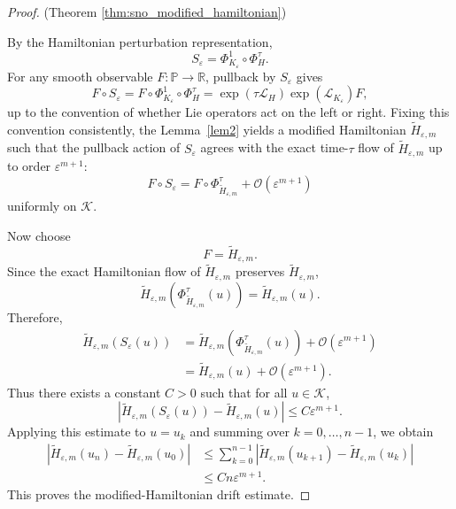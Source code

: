 \documentclass{article}
\theoremstyle{plain}
\theoremstyle{definition}
\theoremstyle{remark}
\newcommand{\bbR}{\mathbb{R}}
\newcommand{\bbP}{\mathbb{P}}
\newcommand{\abs}[1]{\left\lvert #1\right\rvert}
\begin{document}
\begin{proof}(Theorem \ref{thm:sno_modified_hamiltonian})

By the Hamiltonian perturbation representation,
\[
    S_\varepsilon=\Phi_{K_\varepsilon}^1\circ\Phi_H^\tau.
\]
For any smooth observable \(F:\bbP\to\bbR\), pullback by \(S_\varepsilon\) gives
\[
    F\circ S_\varepsilon
    =F\circ\Phi_{K_\varepsilon}^1\circ\Phi_H^\tau
    =\exp(\tau\mathcal{L}_H)\exp(\mathcal{L}_{K_\varepsilon})F,
\]
up to the convention of whether Lie operators act on the left or right. Fixing this convention consistently, the Lemma~\ref{lem2} yields a modified Hamiltonian \(\widetilde H_{\varepsilon,m}\) such that the pullback action of \(S_\varepsilon\) agrees with the exact time-\(\tau\) flow of \(\widetilde H_{\varepsilon,m}\) up to order \(\varepsilon^{m+1}\):
\[
    F\circ S_\varepsilon
    =F\circ\Phi_{\widetilde H_{\varepsilon,m}}^\tau
     +\mathcal{O}(\varepsilon^{m+1})
\]
uniformly on \(\mathcal{K}\).

Now choose
\[
    F=\widetilde H_{\varepsilon,m}.
\]
Since the exact Hamiltonian flow of \(\widetilde H_{\varepsilon,m}\) preserves \(\widetilde H_{\varepsilon,m}\),
\[
    \widetilde H_{\varepsilon,m}(\Phi_{\widetilde H_{\varepsilon,m}}^\tau(u))
    =\widetilde H_{\varepsilon,m}(u).
\]
Therefore,
\[
\begin{aligned}
    \widetilde H_{\varepsilon,m}(S_\varepsilon(u))
    &=\widetilde H_{\varepsilon,m}(\Phi_{\widetilde H_{\varepsilon,m}}^\tau(u))
      +\mathcal{O}(\varepsilon^{m+1}) \\
    &=\widetilde H_{\varepsilon,m}(u)+\mathcal{O}(\varepsilon^{m+1}).
\end{aligned}
\]
Thus there exists a constant \(C>0\) such that for all \(u\in\mathcal{K}\),
\[
    \abs{\widetilde H_{\varepsilon,m}(S_\varepsilon(u))-\widetilde H_{\varepsilon,m}(u)}
    \leq C\varepsilon^{m+1}.
\]
Applying this estimate to \(u=u_k\) and summing over \(k=0,\ldots,n-1\), we obtain
\[
\begin{aligned}
    \abs{\widetilde H_{\varepsilon,m}(u_n)-\widetilde H_{\varepsilon,m}(u_0)}
    &\leq
    \sum_{k=0}^{n-1}
    \abs{\widetilde H_{\varepsilon,m}(u_{k+1})-\widetilde H_{\varepsilon,m}(u_k)} \\
    &\leq Cn\varepsilon^{m+1}.
\end{aligned}
\]
This proves the modified-Hamiltonian drift estimate.


\end{proof}
\end{document}
